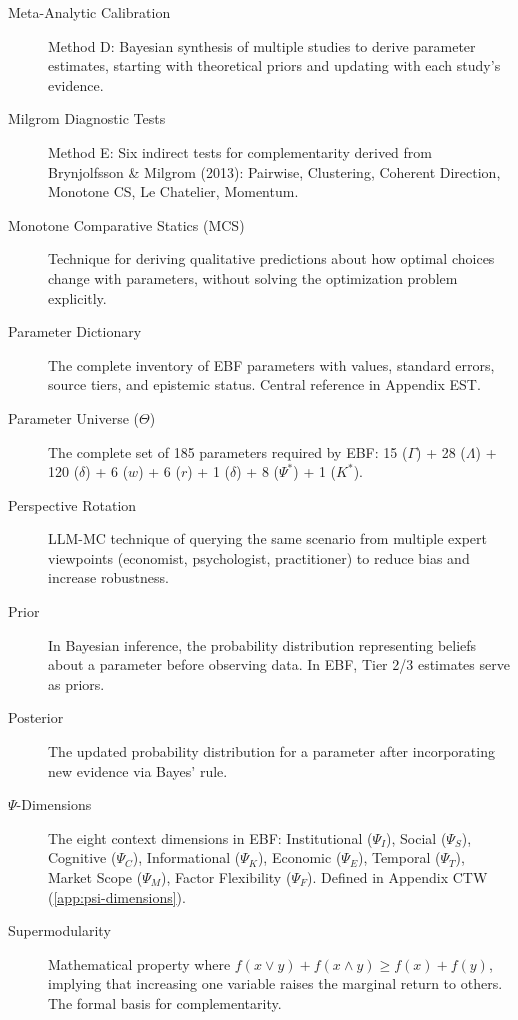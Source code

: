\documentclass[11pt,a4paper]{article}
\theoremstyle{definition}
\begin{document}
\begin{description}
\item[Meta-Analytic Calibration]
Method D: Bayesian synthesis of multiple studies to derive parameter estimates, 
starting with theoretical priors and updating with each study's evidence.

\item[Milgrom Diagnostic Tests]
Method E: Six indirect tests for complementarity derived from 
Brynjolfsson \& Milgrom (2013): Pairwise, Clustering, Coherent Direction, 
Monotone CS, Le Chatelier, Momentum.

\item[Monotone Comparative Statics (MCS)]
Technique for deriving qualitative predictions about how optimal choices 
change with parameters, without solving the optimization problem explicitly.

\item[Parameter Dictionary]
The complete inventory of EBF parameters with values, standard errors, 
source tiers, and epistemic status. Central reference in Appendix EST.

\item[Parameter Universe ($\Theta$)]
The complete set of 185 parameters required by EBF: 15 ($\Gamma$) + 28 ($\Lambda$) 
+ 120 ($\delta$) + 6 ($w$) + 6 ($r$) + 1 ($\delta$) + 8 ($\Psi^*$) + 1 ($K^*$).

\item[Perspective Rotation]
LLM-MC technique of querying the same scenario from multiple expert viewpoints 
(economist, psychologist, practitioner) to reduce bias and increase robustness.

\item[Prior]
In Bayesian inference, the probability distribution representing beliefs about 
a parameter before observing data. In EBF, Tier 2/3 estimates serve as priors.

\item[Posterior]
The updated probability distribution for a parameter after incorporating new 
evidence via Bayes' rule.

\item[$\Psi$-Dimensions]
The eight context dimensions in EBF: Institutional ($\Psi_I$), Social ($\Psi_S$), 
Cognitive ($\Psi_C$), Informational ($\Psi_K$), Economic ($\Psi_E$), Temporal ($\Psi_T$), 
Market Scope ($\Psi_M$), Factor Flexibility ($\Psi_F$). Defined in Appendix CTW (\ref{app:psi-dimensions}).

\item[Supermodularity]
Mathematical property where $f(x \vee y) + f(x \wedge y) \geq f(x) + f(y)$, 
implying that increasing one variable raises the marginal return to others. 
The formal basis for complementarity.


\end{description}
\end{document}
